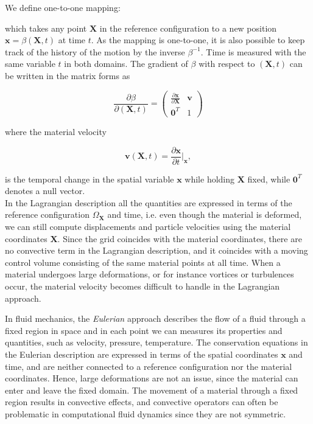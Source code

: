 \documentclass[a4paper,11pt,openright,twoside]{book}
\begin{document}

We define one-to-one mapping:


which takes any point $\mathbf{X}$ in the reference configuration to a new position $\mathbf{x} = \beta(\mathbf{X},t)$ at time $t$. As the mapping is one-to-one, it is also possible to keep track of the history of the motion by the inverse $\beta^{-1}$. Time is measured with the same variable $t$ in both domains. The gradient of $\beta$ with respect to $(\mathbf{X},t)$ can be written in the matrix forms as

\begin{equation}
\frac{\partial \beta}{\partial(\mathbf{X}, t)} = 
\begin{pmatrix}
\frac{\partial \mathbf{x}}{\partial \mathbf{X}} & \mathbf{v} \\
\mathbf{0}^T & 1
\end{pmatrix}
\end{equation}

where the material velocity

\begin{equation}
\mathbf{v}(\mathbf{X}, t) = \frac{\partial \mathbf{x}}{\partial t}|_\mathbf{x},
\end{equation}

is the temporal change in the spatial variable $\mathbf{x}$ while holding $\mathbf{X}$ fixed, while $\mathbf{0}^T$ denotes a null vector. \\
In the Lagrangian description all the quantities are expressed in terms of the reference configuration $\Omega_{\mathbf{X}}$ and time, i.e. even though the material is deformed, we can still compute displacements and particle velocities using the material coordinates $\mathbf{X}$.
Since the grid coincides with the material coordinates, there are no convective term in the Lagrangian description, and it coincides with a moving control volume consisting of the same material points at all time. When a material undergoes large deformations, or for instance vortices or turbulences occur, the material velocity becomes difficult to handle in the Lagrangian approach.

In fluid mechanics, the \emph{Eulerian} approach describes the flow of a fluid through a fixed region in space and in each point we can measures its properties and quantities, such as velocity, pressure, temperature. The conservation equations in the Eulerian description are expressed in terms of the spatial coordinates $\mathbf{x}$ and time, and are neither connected to a reference configuration nor the material coordinates. Hence, large deformations are not an issue, since the material can enter and leave the fixed domain. The movement of a material through a fixed region results in convective effects, and convective operators can often be problematic in computational fluid dynamics since they are not symmetric.
\end{document}
